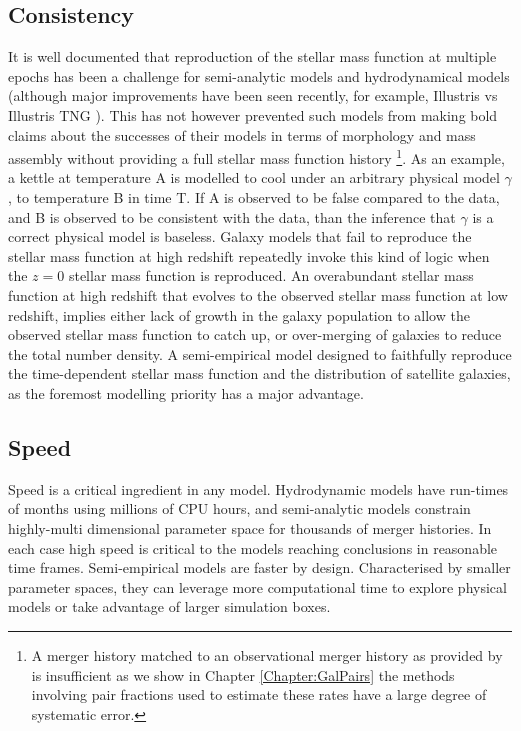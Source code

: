 \subsection{Consistency}
It is well documented that reproduction of the stellar mass function at multiple epochs has been a challenge for semi-analytic models \cite{Knebe2018CosmicModels, Asquith2018CosmicModels} and hydrodynamical models (although major improvements have been seen recently, for example, Illustris vs Illustris TNG \cite{Nelson2015TheRelease, Nelson2019TheRelease}). This has not however prevented such models from making bold claims about the successes of their models in terms of morphology and mass assembly without providing a full stellar mass function history \cite[e.g.][]{Somerville2008ANuclei, Hopkins2010MERGERSMATTER}\footnote{A merger history matched to an observational merger history as provided by \citet{Hopkins2010MERGERSMATTER} is insufficient as we show in Chapter \ref{Chapter:GalPairs} the methods involving pair fractions used to estimate these rates have a large degree of systematic error.}. As an example, a kettle at temperature A is modelled to cool under an arbitrary physical model $\gamma$, to temperature B in time T. If A is observed to be false compared to the data, and B is observed to be consistent with the data, than the inference that $\gamma$ is a correct physical model is baseless. Galaxy models that fail to reproduce the stellar mass function at high redshift repeatedly invoke this kind of logic when the $z=0$ stellar mass function is reproduced. An overabundant stellar mass function at high redshift that evolves to the observed stellar mass function at low redshift, implies either lack of growth in the galaxy population to allow the observed stellar mass function to catch up, or over-merging of galaxies to reduce the total number density. A semi-empirical model designed to faithfully reproduce the time-dependent stellar mass function and the distribution of satellite galaxies, as the foremost modelling priority has a major advantage. 

\subsection{Speed}

Speed is a critical ingredient in any model. Hydrodynamic models have run-times of months using millions of CPU hours, and semi-analytic models constrain highly-multi dimensional parameter space for thousands of merger histories. In each case high speed is critical to the models reaching conclusions in reasonable time frames. Semi-empirical models are faster by design. Characterised by smaller parameter spaces, they can leverage more computational time to explore physical models or take advantage of larger simulation boxes. 


